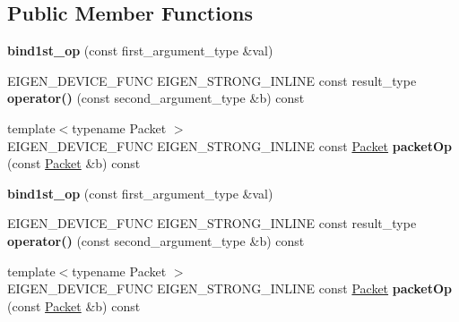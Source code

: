 \subsection*{Public Member Functions}
\begin{DoxyCompactItemize}
\item 
\mbox{\label{struct_eigen_1_1internal_1_1bind1st__op_ad94de0363c64e023025e925eecfe3bee}} 
{\bfseries bind1st\+\_\+op} (const first\+\_\+argument\+\_\+type \&val)
\item 
\mbox{\label{struct_eigen_1_1internal_1_1bind1st__op_ab6afd4a874b1cc79c44b3212f34b773f}} 
E\+I\+G\+E\+N\+\_\+\+D\+E\+V\+I\+C\+E\+\_\+\+F\+U\+NC E\+I\+G\+E\+N\+\_\+\+S\+T\+R\+O\+N\+G\+\_\+\+I\+N\+L\+I\+NE const result\+\_\+type {\bfseries operator()} (const second\+\_\+argument\+\_\+type \&b) const
\item 
\mbox{\label{struct_eigen_1_1internal_1_1bind1st__op_a3c64838212ad6e17a20a0452e3dd87e3}} 
{\footnotesize template$<$typename Packet $>$ }\\E\+I\+G\+E\+N\+\_\+\+D\+E\+V\+I\+C\+E\+\_\+\+F\+U\+NC E\+I\+G\+E\+N\+\_\+\+S\+T\+R\+O\+N\+G\+\_\+\+I\+N\+L\+I\+NE const \hyperlink{union_eigen_1_1internal_1_1_packet}{Packet} {\bfseries packet\+Op} (const \hyperlink{union_eigen_1_1internal_1_1_packet}{Packet} \&b) const
\item 
\mbox{\label{struct_eigen_1_1internal_1_1bind1st__op_ad94de0363c64e023025e925eecfe3bee}} 
{\bfseries bind1st\+\_\+op} (const first\+\_\+argument\+\_\+type \&val)
\item 
\mbox{\label{struct_eigen_1_1internal_1_1bind1st__op_ab6afd4a874b1cc79c44b3212f34b773f}} 
E\+I\+G\+E\+N\+\_\+\+D\+E\+V\+I\+C\+E\+\_\+\+F\+U\+NC E\+I\+G\+E\+N\+\_\+\+S\+T\+R\+O\+N\+G\+\_\+\+I\+N\+L\+I\+NE const result\+\_\+type {\bfseries operator()} (const second\+\_\+argument\+\_\+type \&b) const
\item 
\mbox{\label{struct_eigen_1_1internal_1_1bind1st__op_a3c64838212ad6e17a20a0452e3dd87e3}} 
{\footnotesize template$<$typename Packet $>$ }\\E\+I\+G\+E\+N\+\_\+\+D\+E\+V\+I\+C\+E\+\_\+\+F\+U\+NC E\+I\+G\+E\+N\+\_\+\+S\+T\+R\+O\+N\+G\+\_\+\+I\+N\+L\+I\+NE const \hyperlink{union_eigen_1_1internal_1_1_packet}{Packet} {\bfseries packet\+Op} (const \hyperlink{union_eigen_1_1internal_1_1_packet}{Packet} \&b) const
\end{DoxyCompactItemize}
